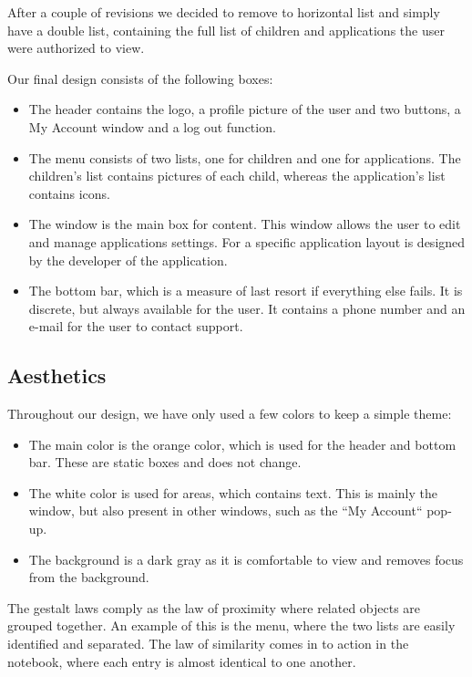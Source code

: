 
After a couple of revisions we decided to remove to horizontal list and simply have a double list, containing the full list of children and applications the user were authorized to view. 


Our final design consists of the following boxes:
\begin{itemize}
 \item The header contains the logo, a profile picture of the user and two buttons, a My Account window and a log out function.
 \item The menu consists of two lists, one for children and one for applications. The children's list contains pictures of each child, whereas the application's list contains icons. 
 \item The window is the main box for content. This window allows the user to edit and manage applications settings. For a specific application layout is designed by the developer of the application.
 \item The bottom bar, which is a measure of last resort if everything else fails. It is discrete, but always available for the user. It contains a phone number and an e-mail for the user to contact support.
\end{itemize}


\subsection{Aesthetics}
Throughout our design, we have only used a few colors to keep a simple theme:
\begin{itemize}
 \item The main color is the orange color, which is used for the header and bottom bar. These are static boxes and does not change.
 \item The white color is used for areas, which contains text. This is mainly the window, but also present in other windows, such as the ``My Account`` pop-up.
 \item The background is a dark gray as it is comfortable to view and removes focus from the background. 
\end{itemize}

The gestalt laws comply as the law of proximity where related objects are grouped together. An example of this is the menu, where the two lists are easily identified and separated. The law of similarity comes in to action in the notebook, where each entry is almost identical to one another.